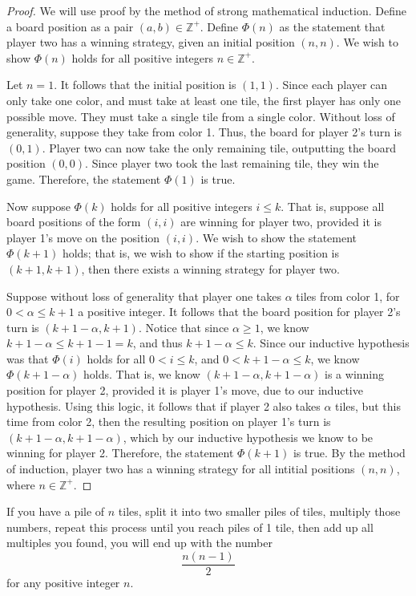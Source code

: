 \documentclass[11pt, letterpaper]{report}
\begin{document}
\begin{proof}
	We will use proof by the method of strong mathematical induction. Define a board position as a pair $(a,b)\in\mathbb{Z}^+$. Define $\Phi (n)$ as the statement that player two has a winning strategy, given an initial position $(n,n)$. We wish to show $\Phi (n)$ holds for all positive integers $n\in\mathbb{Z}^+$.

	Let $n=1$. It follows that the initial position is $(1,1)$. Since each player can only take one color, and must take at least one tile, the first player has only one possible move. They must take a single tile from a single color. Without loss of generality, suppose they take from color 1. Thus, the board for player 2's turn is $(0,1)$. Player two can now take the only remaining tile, outputting the board position $(0,0)$. Since player two took the last remaining tile, they win the game. Therefore, the statement $\Phi (1)$ is true.

	Now suppose $\Phi (k)$ holds for all positive integers $i\leq k$. That is, suppose all board positions of the form $(i,i)$ are winning for player two, provided it is player 1's move on the position $(i,i)$. We wish to show the statement $\Phi (k+1)$ holds; that is, we wish to show if the starting position is $(k+1,k+1)$, then there exists a winning strategy for player two.

	Suppose without loss of generality that player one takes $\alpha $ tiles from color 1, for $0<\alpha\leq k+1 $ a positive integer. It follows that the board position for player 2's turn is $(k+1-\alpha ,k+1)$. Notice that since $\alpha \geq 1$, we know $k+1-\alpha \leq k+1-1=k$, and thus $k+1-\alpha \leq  k$. Since our inductive hypothesis was that $\Phi (i)$ holds for all $0<i\leq k$, and $0<k+1-\alpha \leq k$, we know $\Phi (k+1-\alpha )$ holds. That is, we know $(k+1-\alpha ,k+1-\alpha )$ is a winning position for player 2, provided it is player 1's move, due to our inductive hypothesis. Using this logic, it follows that if player 2 also takes $\alpha $ tiles, but this time from color 2, then the resulting position on player 1's turn is $(k+1-\alpha ,k+1-\alpha )$, which by our inductive hypothesis we know to be winning for player 2. Therefore, the statement $\Phi (k+1)$ is true. By the method of induction, player two has a winning strategy for all intitial positions $(n,n)$, where $n\in\mathbb{Z}^+$.
\end{proof}
\setcounter{theorem}{3}
\begin{theorem}\label{thm:4}
	If you have a pile of $n$ tiles, split it into two smaller piles of tiles, multiply those numbers, repeat this process until you reach piles of 1 tile, then add up all multiples you found, you will end up with the number
	\[
		\frac{n(n-1)}{2}
	\]
	for any positive integer $n$.
\end{theorem}
\end{document}
